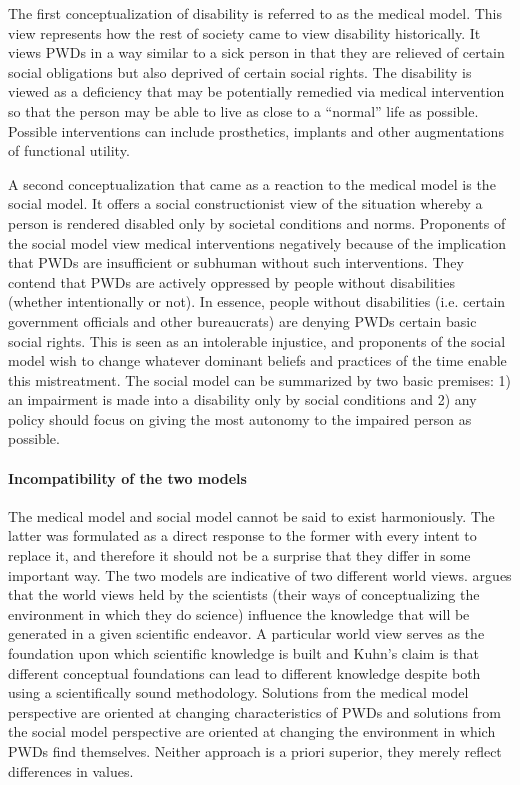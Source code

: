 \documentclass[a4paper]{article}
\begin{document}
The first conceptualization of disability is referred to as the medical model.
This view represents how the rest of society came to view disability
historically. It views PWDs in a way similar to a sick person in that they are
relieved of certain social obligations but also deprived of certain social
rights. The disability is viewed as a deficiency that may be potentially
remedied via medical intervention so that the person may be able to live as
close to a ``normal'' life as possible. Possible interventions can include
prosthetics, implants and other augmentations of functional utility.

A second conceptualization that came as a reaction to the medical model is the
social model. It offers a social constructionist view of the situation whereby
a person is rendered disabled only by societal conditions and norms.
Proponents of the social model view medical interventions negatively because
of the implication that PWDs are insufficient or subhuman without such
interventions. They contend that PWDs are actively oppressed by people without
disabilities (whether intentionally or not). In essence, people without
disabilities (i.e. certain government officials and other bureaucrats) are
denying PWDs certain basic social rights. This is seen as an intolerable
injustice, and proponents of the social model wish to change whatever dominant
beliefs and practices of the time enable this mistreatment. The social model
can be summarized by two basic premises: 1) an impairment is made into a
disability only by social conditions and 2) any policy should focus on giving
the most autonomy to the impaired person as possible.



\paragraph{Incompatibility of the two models}

The medical model and social model cannot be said to exist harmoniously. The
latter was formulated as a direct response to the former with every intent to
replace it, and therefore it should not be a surprise that they differ in some
important way. The two models are indicative of two different world views.
\cite{kuhn1970structure} argues that the world views held by the scientists
(their ways of conceptualizing the environment in which they do science)
influence the knowledge that will be generated in a given scientific endeavor.
A particular world view serves as the foundation upon which scientific
knowledge is built and Kuhn's claim is that different conceptual foundations
can lead to different knowledge despite both using a scientifically sound
methodology. Solutions from the medical model perspective are oriented at
changing characteristics of PWDs and solutions from the social model
perspective are oriented at changing the environment in which PWDs find
themselves. Neither approach is a priori superior, they merely reflect
differences in values.
\end{document}
